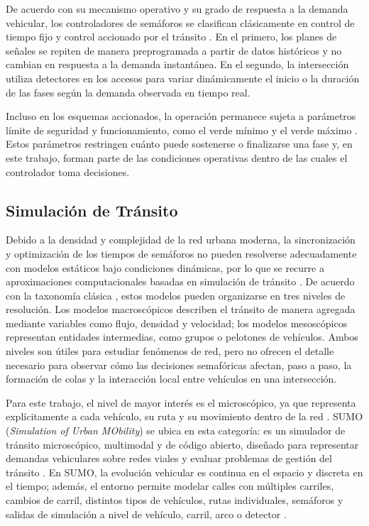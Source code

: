 De acuerdo con su mecanismo operativo y su grado de respuesta a la demanda vehicular, los controladores de semáforos se clasifican clásicamente en control de tiempo fijo y control accionado por el tránsito \cite[Sec.~4, pp.~339--340]{ite_handbook}. En el primero, los planes de señales se repiten de manera preprogramada a partir de datos históricos y no cambian en respuesta a la demanda instantánea. En el segundo, la intersección utiliza detectores en los accesos para variar dinámicamente el inicio o la duración de las fases según la demanda observada en tiempo real.

Incluso en los esquemas accionados, la operación permanece sujeta a parámetros límite de seguridad y funcionamiento, como el verde mínimo y el verde máximo \cite[pp.~346--348]{ite_handbook}. Estos parámetros restringen cuánto puede sostenerse o finalizarse una fase y, en este trabajo, forman parte de las condiciones operativas dentro de las cuales el controlador toma decisiones.

\subsection{Simulación de Tránsito}

Debido a la densidad y complejidad de la red urbana moderna, la sincronización y optimización de los tiempos de semáforos no pueden resolverse adecuadamente con modelos estáticos bajo condiciones dinámicas, por lo que se recurre a aproximaciones computacionales basadas en simulación de tránsito \cite[p.~355]{ite_handbook}. De acuerdo con la taxonomía clásica \cite[Cap.~4, Sec.~4.1, p.~147]{fernandez}, estos modelos pueden organizarse en tres niveles de resolución. Los modelos macroscópicos describen el tránsito de manera agregada mediante variables como flujo, densidad y velocidad; los modelos mesoscópicos representan entidades intermedias, como grupos o pelotones de vehículos. Ambos niveles son útiles para estudiar fenómenos de red, pero no ofrecen el detalle necesario para observar cómo las decisiones semafóricas afectan, paso a paso, la formación de colas y la interacción local entre vehículos en una intersección.

Para este trabajo, el nivel de mayor interés es el microscópico, ya que representa explícitamente a cada vehículo, su ruta y su movimiento dentro de la red \cite[Cap.~4, Sec.~4.1, p.~147]{fernandez}. SUMO (\textit{Simulation of Urban MObility}) se ubica en esta categoría: es un simulador de tránsito microscópico, multimodal y de código abierto, diseñado para representar demandas vehiculares sobre redes viales y evaluar problemas de gestión del tránsito \cite{SUMO2018_SUMO,sumo-doc}. En SUMO, la evolución vehicular es continua en el espacio y discreta en el tiempo; además, el entorno permite modelar calles con múltiples carriles, cambios de carril, distintos tipos de vehículos, rutas individuales, semáforos y salidas de simulación a nivel de vehículo, carril, arco o detector \cite{sumo-doc}.

